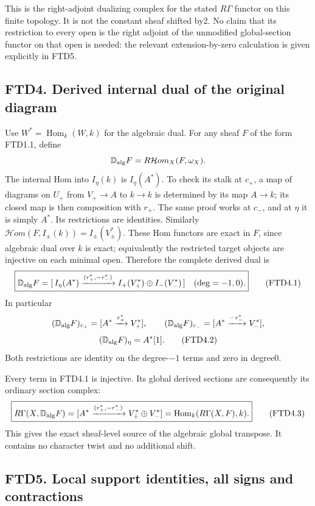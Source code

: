 This is the right-adjoint dualizing complex for the stated \(R\Gamma\)
functor on this finite topology. It is not the constant sheaf shifted
by2. No claim that its restriction to every open is the right adjoint of
the unmodified global-section functor on that open is needed: the
relevant extension-by-zero calculation is given explicitly in FTD5.

\subsection{FTD4. Derived internal dual of the original
diagram}\label{ftd4.-derived-internal-dual-of-the-original-diagram}

Use \(W^*=\operatorname{Hom}_k(W,k)\) for the algebraic dual. For any
sheaf \(F\) of the form FTD1.1, define \[
\mathbb D_{\rm alg}F=R\mathcal Hom_X(F,\omega_X).
\] The internal Hom into \(I_\eta(k)\) is \(I_\eta(A^*)\). To check its
stalk at \(c_+\), a map of diagrams on \(U_+\) from \(V_+\to A\) to
\(k\to k\) is determined by its map \(A\to k\); its closed map is then
composition with \(r_+\). The same proof works at \(c_-\), and at
\(\eta\) it is simply \(A^*\). Its restrictions are identities.
Similarly \(\mathcal Hom(F,I_\pm(k))=I_\pm(V_\pm^*)\). These Hom
functors are exact in \(F\), since algebraic dual over \(k\) is exact;
equivalently the restricted target objects are injective on each minimal
open. Therefore the complete derived dual is \[
\boxed{
\mathbb D_{\rm alg}F=
[\,I_\eta(A^*)\xrightarrow{(r_+^*,-r_-^*)}
I_+(V_+^*)\oplus I_-(V_-^*)\,]
\quad(\deg=-1,0).}
\tag{FTD4.1}
\] In particular \[
(\mathbb D_{\rm alg}F)_{c_+}
=[A^*\xrightarrow{r_+^*}V_+^*],\qquad
(\mathbb D_{\rm alg}F)_{c_-}
=[A^*\xrightarrow{-r_-^*}V_-^*],
\] \[
(\mathbb D_{\rm alg}F)_\eta=A^*[1].
\tag{FTD4.2}
\] Both restrictions are identity on the degree-\(-1\) terms and zero in
degree0.

Every term in FTD4.1 is injective. Its global derived sections are
consequently its ordinary section complex: \[
\boxed{
R\Gamma(X,\mathbb D_{\rm alg}F)
=[A^*\xrightarrow{(r_+^*,-r_-^*)}V_+^*\oplus V_-^*]
=\operatorname{Hom}_k(R\Gamma(X,F),k).}
\tag{FTD4.3}
\] This gives the exact sheaf-level source of the algebraic global
transpose. It contains no character twist and no additional shift.

\subsection{FTD5. Local support identities, all signs and
contractions}\label{ftd5.-local-support-identities-all-signs-and-contractions}

